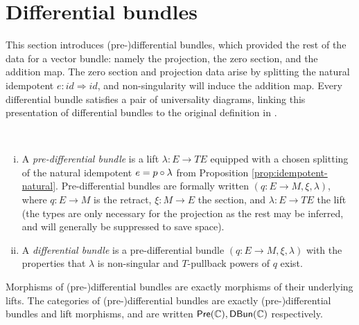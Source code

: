 




\section{Differential bundles}%
\label{sec:lifts-pdbs-dbs}

This section introduces (pre-)differential bundles, which provided the rest of the data for a vector bundle: namely the projection, the zero section, and the addition map. The zero section and projection data arise by splitting the natural idempotent $e: id \Rightarrow id$, and non-singularity will induce the addition map. Every differential bundle satisfies a pair of universality diagrams, linking this presentation of differential bundles to the original definition in \cite{Cockett2018}.

\begin{definition}%
  \label{def:pdb}
  ~\begin{enumerate}[(i)]
    \item A \emph{pre-differential bundle} is a lift $\lambda:E \to TE$ equipped with a chosen splitting of the natural idempotent $e = p \circ \lambda$ from Proposition \ref{prop:idempotent-natural}. Pre-differential bundles are formally written $(q:E \to M, \xi, \lambda)$, where $q:E \to M$ is the retract, $\xi:M \to E$ the section, and $\lambda:E \to TE$ the lift (the types are only necessary for the projection as the rest may be inferred, and will generally be suppressed to save space).
    \item A \emph{differential bundle} is a pre-differential bundle $(q:E \to M, \xi, \lambda)$ with the properties that $\lambda$ is non-singular and $T$-pullback powers of $q$ exist.
  \end{enumerate}
  Morphisms of (pre-)differential bundles are exactly morphisms of their underlying lifts. The categories of (pre-)differential bundles are exactly (pre-)differential bundles and lift morphisms, and are written $\mathsf{Pre}(\mathbb{C}), \mathsf{DBun}(\mathbb{C})$ respectively.
\end{definition}

